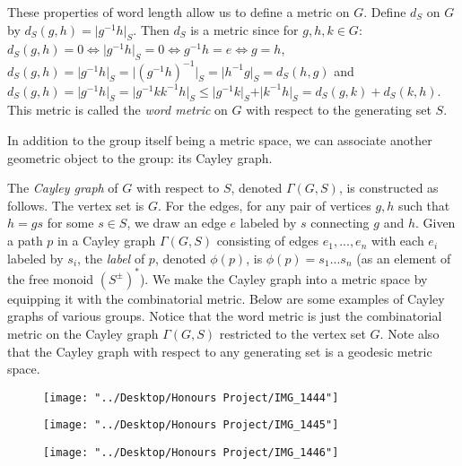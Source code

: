 \documentclass[12pt]{article}
\newcommand{\vs}{\vskip10pt}
\begin{document}
	These properties of word length allow us to define a metric on $G$. Define $d_S$ on $G$ by $d_S(g,h) = \vert g^{-1}h \vert_S$. Then $d_S$ is a metric since for $g,h,k \in G$: $d_S(g,h) = 0 \iff \vert g^{-1} h \vert_S = 0 \iff g^{-1} h = e \iff g = h$, $d_S(g,h) = \vert g^{-1}h \vert_S = \vert (g^{-1}h)^{-1} \vert_S = \vert h^{-1} g \vert_S = d_S(h,g)$ and $d_S(g,h) = \vert g^{-1} h \vert_S = \vert g^{-1} k k^{-1} h \vert_S \leq \vert g^{-1} k \vert_S + \vert k^{-1} h \vert_S = d_S(g,k) + d_S(k,h)$. This metric is called the \textit{word metric} on $G$ with respect to the generating set $S$. 
	
	\vs 
	
	In addition to the group itself being a metric space, we can associate another geometric object to the group: its Cayley graph.
	
	\vs 
	
	The \textit{Cayley graph} of $G$ with respect to $S$, denoted $\Gamma(G, S)$, is constructed as follows. The vertex set is $G$. For the edges, for any pair of vertices $g, h$ such that $h = gs$ for some $s \in S$, we draw an edge $e$ labeled by $s$ connecting $g$ and $h$. Given a path $p$ in a Cayley graph $\Gamma(G,S)$ consisting of edges $e_1,...,e_n$ with each $e_i$ labeled by $s_i$, the \textit{label} of $p$, denoted $\phi(p)$, is $\phi(p) = s_1...s_n$ (as an element of the free monoid $(S^{\pm})^*$). We make the Cayley graph into a metric space by equipping it with the combinatorial metric. Below are some examples of Cayley graphs of various groups. Notice that the word metric is just the combinatorial metric on the Cayley graph $\Gamma(G, S)$ restricted to the vertex set $G$. Note also that the Cayley graph with respect to any generating set is a geodesic metric space. 
	
	
\begin{figure} [h]
	\centering
	\texttt{[image: "../Desktop/Honours Project/IMG\_1444"]}
	\caption{}
	\label{fig:img1444}
\end{figure}

\begin{figure}
	\centering
	\texttt{[image: "../Desktop/Honours Project/IMG\_1445"]}
	\caption{}
	\label{fig:img1445}
\end{figure}
	\vs 
\begin{figure}
	\centering
	\texttt{[image: "../Desktop/Honours Project/IMG\_1446"]}
	\caption{}
	\label{fig:img1446}
\end{figure}
	
\end{document}
